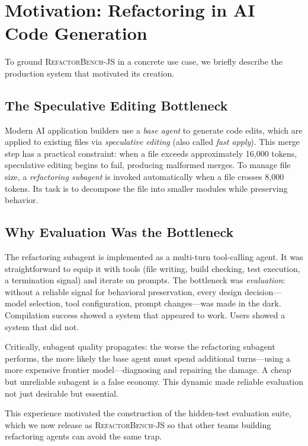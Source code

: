 \documentclass[11pt,letterpaper]{article}
\begin{document}
\section{Motivation: Refactoring in AI Code Generation}
\label{sec:motivation}

To ground \textsc{RefactorBench}-JS in a concrete use case, we briefly describe the production system that motivated its creation.

\subsection{The Speculative Editing Bottleneck}

Modern AI application builders use a \emph{base agent} to generate code edits, which are applied to existing files via \emph{speculative editing} (also called \emph{fast apply}). This merge step has a practical constraint: when a file exceeds approximately 16{,}000 tokens, speculative editing begins to fail, producing malformed merges. To manage file size, a \emph{refactoring subagent} is invoked automatically when a file crosses 8{,}000 tokens. Its task is to decompose the file into smaller modules while preserving behavior.

\subsection{Why Evaluation Was the Bottleneck}

The refactoring subagent is implemented as a multi-turn tool-calling agent. It was straightforward to equip it with tools (file writing, build checking, test execution, a termination signal) and iterate on prompts. The bottleneck was \emph{evaluation}: without a reliable signal for behavioral preservation, every design decision---model selection, tool configuration, prompt changes---was made in the dark. Compilation success showed a system that appeared to work. Users showed a system that did not.

Critically, subagent quality propagates: the worse the refactoring subagent performs, the more likely the base agent must spend additional turns---using a more expensive frontier model---diagnosing and repairing the damage. A cheap but unreliable subagent is a false economy. This dynamic made reliable evaluation not just desirable but essential.

This experience motivated the construction of the hidden-test evaluation suite, which we now release as \textsc{RefactorBench}-JS so that other teams building refactoring agents can avoid the same trap.
\end{document}
